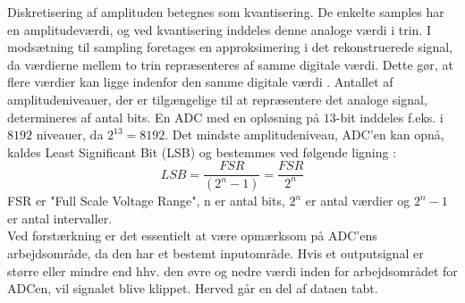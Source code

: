 Diskretisering af amplituden betegnes som kvantisering. De enkelte samples har en amplitudeværdi, og ved kvantisering inddeles denne analoge værdi i trin. I modsætning til sampling foretages en approksimering i det rekonstruerede signal, da værdierne mellem to trin repræsenteres af samme digitale værdi. Dette gør, at flere værdier kan ligge indenfor den samme digitale værdi \cite{Zouridakis2003}. Antallet af amplitudeniveauer, der er tilgængelige til at repræsentere det analoge signal, determineres af antal bits. En ADC med en opløsning på $13$-bit inddeles f.eks. i $8192$ niveauer, da $2^{13}=8192$. \cite{Konrad2006} Det mindste amplitudeniveau, ADC'en kan opnå, kaldes Least Significant Bit (LSB) og bestemmes ved følgende ligning \cite{webster2009,Wolf2004,Aminoff2012}:
\begin{equation}\label{ligningLSB}
LSB = \frac{FSR}{(2^{n}-1)} = \frac{FSR}{2^{n}}
\end{equation}
FSR er "Full Scale Voltage Range", n er antal bits, $2^n$ er antal værdier og $2^{n}-1$ er antal intervaller. \\
Ved forstærkning er det essentielt at være opmærksom på ADC'ens arbejdsområde, da den har et bestemt inputområde. Hvis et outputsignal er større eller mindre end hhv. den øvre og nedre værdi inden for arbejdsområdet for ADCen, vil signalet blive klippet. Herved går en del af dataen tabt. \cite{webster2009,Wolf2004,Aminoff2012}